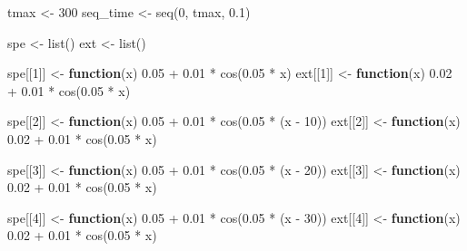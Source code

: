 \documentclass[
]{article}
\newenvironment{Shaded}{\begin{snugshade}}{\end{snugshade}}
\newcommand{\ControlFlowTok}[1]{\textcolor[rgb]{0.13,0.29,0.53}{\textbf{#1}}}
\newcommand{\DecValTok}[1]{\textcolor[rgb]{0.00,0.00,0.81}{#1}}
\newcommand{\FloatTok}[1]{\textcolor[rgb]{0.00,0.00,0.81}{#1}}
\newcommand{\FunctionTok}[1]{\textcolor[rgb]{0.00,0.00,0.00}{#1}}
\newcommand{\NormalTok}[1]{#1}
\newcommand{\OtherTok}[1]{\textcolor[rgb]{0.56,0.35,0.01}{#1}}
\newcommand{\SpecialCharTok}[1]{\textcolor[rgb]{0.00,0.00,0.00}{#1}}
\begin{document}
\begin{Shaded}
\begin{Highlighting}[]
\NormalTok{tmax }\OtherTok{\textless{}{-}} \DecValTok{300}
\NormalTok{seq\_time }\OtherTok{\textless{}{-}} \FunctionTok{seq}\NormalTok{(}\DecValTok{0}\NormalTok{, tmax, }\FloatTok{0.1}\NormalTok{)}

\NormalTok{spe }\OtherTok{\textless{}{-}} \FunctionTok{list}\NormalTok{()}
\NormalTok{ext }\OtherTok{\textless{}{-}} \FunctionTok{list}\NormalTok{()}

\NormalTok{spe[[}\DecValTok{1}\NormalTok{]] }\OtherTok{\textless{}{-}} \ControlFlowTok{function}\NormalTok{(x) }\FloatTok{0.05} \SpecialCharTok{+} \FloatTok{0.01} \SpecialCharTok{*} \FunctionTok{cos}\NormalTok{(}\FloatTok{0.05} \SpecialCharTok{*}\NormalTok{ x)}
\NormalTok{ext[[}\DecValTok{1}\NormalTok{]] }\OtherTok{\textless{}{-}} \ControlFlowTok{function}\NormalTok{(x) }\FloatTok{0.02} \SpecialCharTok{+} \FloatTok{0.01} \SpecialCharTok{*} \FunctionTok{cos}\NormalTok{(}\FloatTok{0.05} \SpecialCharTok{*}\NormalTok{ x)}

\NormalTok{spe[[}\DecValTok{2}\NormalTok{]] }\OtherTok{\textless{}{-}} \ControlFlowTok{function}\NormalTok{(x) }\FloatTok{0.05} \SpecialCharTok{+} \FloatTok{0.01} \SpecialCharTok{*} \FunctionTok{cos}\NormalTok{(}\FloatTok{0.05} \SpecialCharTok{*}\NormalTok{ (x }\SpecialCharTok{{-}} \DecValTok{10}\NormalTok{))}
\NormalTok{ext[[}\DecValTok{2}\NormalTok{]] }\OtherTok{\textless{}{-}} \ControlFlowTok{function}\NormalTok{(x) }\FloatTok{0.02} \SpecialCharTok{+} \FloatTok{0.01} \SpecialCharTok{*} \FunctionTok{cos}\NormalTok{(}\FloatTok{0.05} \SpecialCharTok{*}\NormalTok{ x)}

\NormalTok{spe[[}\DecValTok{3}\NormalTok{]] }\OtherTok{\textless{}{-}} \ControlFlowTok{function}\NormalTok{(x) }\FloatTok{0.05} \SpecialCharTok{+} \FloatTok{0.01} \SpecialCharTok{*} \FunctionTok{cos}\NormalTok{(}\FloatTok{0.05} \SpecialCharTok{*}\NormalTok{ (x }\SpecialCharTok{{-}} \DecValTok{20}\NormalTok{))}
\NormalTok{ext[[}\DecValTok{3}\NormalTok{]] }\OtherTok{\textless{}{-}} \ControlFlowTok{function}\NormalTok{(x) }\FloatTok{0.02} \SpecialCharTok{+} \FloatTok{0.01} \SpecialCharTok{*} \FunctionTok{cos}\NormalTok{(}\FloatTok{0.05} \SpecialCharTok{*}\NormalTok{ x)}

\NormalTok{spe[[}\DecValTok{4}\NormalTok{]] }\OtherTok{\textless{}{-}} \ControlFlowTok{function}\NormalTok{(x) }\FloatTok{0.05} \SpecialCharTok{+} \FloatTok{0.01} \SpecialCharTok{*} \FunctionTok{cos}\NormalTok{(}\FloatTok{0.05} \SpecialCharTok{*}\NormalTok{ (x }\SpecialCharTok{{-}} \DecValTok{30}\NormalTok{))}
\NormalTok{ext[[}\DecValTok{4}\NormalTok{]] }\OtherTok{\textless{}{-}} \ControlFlowTok{function}\NormalTok{(x) }\FloatTok{0.02} \SpecialCharTok{+} \FloatTok{0.01} \SpecialCharTok{*} \FunctionTok{cos}\NormalTok{(}\FloatTok{0.05} \SpecialCharTok{*}\NormalTok{ x)}
\end{Highlighting}
\end{Shaded}
\end{document}
